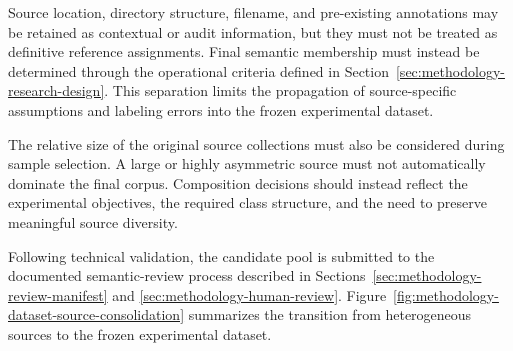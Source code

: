 Source location, directory structure, filename, and pre-existing annotations
may be retained as contextual or audit information, but they must not be
treated as definitive reference assignments. Final semantic membership must
instead be determined through the operational criteria defined in
Section~\ref{sec:methodology-research-design}. This separation limits the
propagation of source-specific assumptions and labeling errors into the frozen
experimental dataset.

The relative size of the original source collections must also be considered
during sample selection. A large or highly asymmetric source must not
automatically dominate the final corpus. Composition decisions should instead
reflect the experimental objectives, the required class structure, and the
need to preserve meaningful source diversity.

Following technical validation, the candidate pool is submitted to the
documented semantic-review process described in
Sections~\ref{sec:methodology-review-manifest} and
\ref{sec:methodology-human-review}. Figure~\ref{fig:methodology-dataset-source-consolidation}
summarizes the transition from heterogeneous sources to the frozen
experimental dataset.

